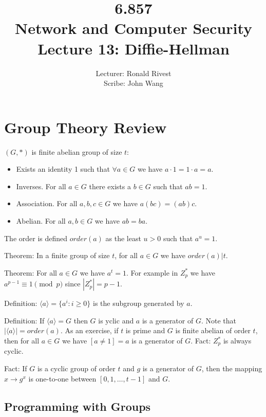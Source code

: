 \documentclass[psamsfonts]{amsart}
\title{6.857 \\
Network and Computer Security \\
Lecture 13: Diffie-Hellman}
\author{Lecturer: Ronald Rivest\\
Scribe: John Wang}
\begin{document}
\maketitle

\section{Group Theory Review}

$(G,*)$ is finite abelian group of size $t$:
\begin{itemize}
  \item Exists an identity 1 such that $\forall a \in G$ we have $a \cdot 1 = 1 \cdot a = a$.
  \item Inverses. For all $a \in G$ there exists a $b \in G$ such that $ab = 1$.
  \item Association. For all $a,b,c \in G$ we have $a (bc) = (ab) c$.
  \item Abelian. For all $a,b \in G$ we have $ab = ba$.
\end{itemize}

The order is defined $order(a)$ as the least $u > 0$ such that $a^u = 1$.

Theorem: In a finite group of size $t$, for all $a \in G$ we have $order(a) | t$.

Theorem: For all $a \in G$ we have $a^t = 1$. For example in $Z_p^*$ we have $a^{p-1} \equiv 1 \pmod{p}$ since $|Z_{p}^*| = p-1$.

Definition: $\langle a \rangle = \{a^i : i \geq 0\}$ is the subgroup generated by $a$.

Definition: If $\langle a \rangle = G$ then $G$ is yclic and $a$ is a generator of $G$. Note that $| \langle a \rangle | = order(a)$. As an exercise, if $t$ is prime and $G$ is finite abelian of order $t$, then for all $a \in G$ we have $[a \neq 1] = a$ is a generator of $G$. Fact: $Z_{p}^*$ is always cyclic.

Fact: If $G$ is a cyclic group of order $t$ and $g$ is a generator of $G$, then the mapping $x \to g^x$ is one-to-one between $[0,1, \ldots, t-1]$ and $G$.

\subsection{Programming with Groups}
\end{document}
